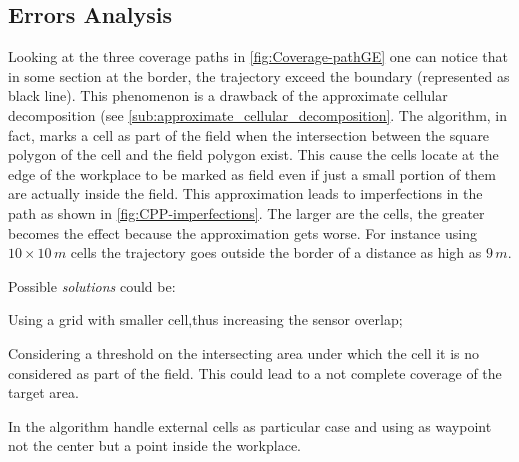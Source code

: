 \subsection{Errors Analysis} %
\label{sub:errors_analysis}
Looking at the three coverage paths in \autoref{fig:Coverage-pathGE} one can notice that in some section at the border, the trajectory exceed the boundary (represented as black line). This phenomenon is a drawback of the approximate cellular decomposition (see \autoref{sub:approximate_cellular_decomposition}. The algorithm, in fact, marks a cell as part of the field when the intersection between the square polygon of the cell and the field polygon
exist. This cause the cells locate at the edge of the workplace to be marked as field even if just a small portion of them are actually inside the field. This approximation leads to imperfections in the path as shown in \autoref{fig:CPP-imperfections}. The larger are the cells, the greater becomes the effect because the approximation gets worse. For instance using $10 \times 10\, m$ cells the trajectory goes outside the border of a distance as high as $9\, m$.\par
Possible \textit{solutions} could be:
 \begin{enumerate*}
	\item Using a grid with smaller cell,thus increasing the sensor overlap;
	\item Considering a threshold on the intersecting area under which the cell it is no considered as part of the field. This could lead to a not complete coverage of the target area.
	\item In the algorithm handle external cells as particular case and using as waypoint not the center but a point inside the workplace.
\end{enumerate*}


